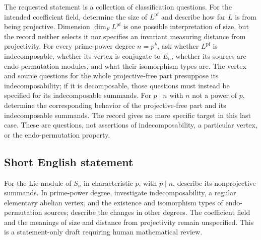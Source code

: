 \documentclass[11pt]{article}
\begin{document}
The requested statement is a collection of classification questions. For the intended coefficient field, determine the size of \(L^{\mathrm{pf}}\) and describe how far \(L\) is from being projective. Dimension \(\dim_F L^{\mathrm{pf}}\) is one possible interpretation of size, but the record neither selects it nor specifies an invariant measuring distance from projectivity. For every prime-power degree \(n=p^k\), ask whether \(L^{\mathrm{pf}}\) is indecomposable, whether its vertex is conjugate to \(E_n\), whether its sources are endo-permutation modules, and what their isomorphism types are. The vertex and source questions for the whole projective-free part presuppose its indecomposability; if it is decomposable, those questions must instead be specified for its indecomposable summands. For \(p\mid n\) with \(n\) not a power of \(p\), determine the corresponding behavior of the projective-free part and its indecomposable summands. The record gives no more specific target in this last case. These are questions, not assertions of indecomposability, a particular vertex, or the endo-permutation property.
\subsection{Short English statement}
For the Lie module of \(S_n\) in characteristic \(p\), with \(p\mid n\), describe its nonprojective summands. In prime-power degree, investigate indecomposability, a regular elementary abelian vertex, and the existence and isomorphism types of endo-permutation sources; describe the changes in other degrees. The coefficient field and the meanings of size and distance from projectivity remain unspecified. This is a statement-only draft requiring human mathematical review.
\end{document}
